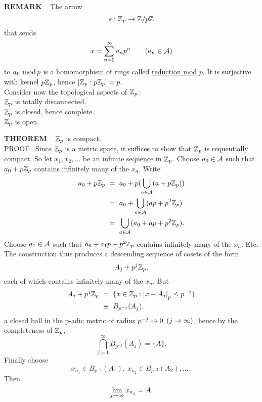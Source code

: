 \begin{x}{\small\bf REMARK} \ %
The arrow
\[
\epsilon: \mathbb{Z}_p \rightarrow \mathbb{Z} / p\mathbb{Z}
\]
that sends
\[
x = \sum_{n=0}^\infty a_np^n		\qquad \text{($a_n \in\mathcal{A}$)}
\]
to $a_0 \ \text{mod}\hspace{0.05cm} p$ is a homomorphism of rings called 
\underline{reduction mod $p$}.  
It is surjective with kernel $p\mathbb{Z}_p$, hence $[\mathbb{Z}_p:p\mathbb{Z}_p] = p$.\\

Consider now the topological aspects of $\mathbb{Z}_p$:\\
\indent\textbullet \quad $\mathbb{Z}_p$ is totally disconnected.\\
\indent\textbullet \quad $\mathbb{Z}_p$ is closed, hence complete.\\
\indent\textbullet \quad $\mathbb{Z}_p$ is open.\\

\]
\end{x}
\vspace{0.1cm}

\begin{x}{\small\bf THEOREM} \ %
$\mathbb{Z}_p$ is compact.\\

\indent PROOF \  
Since $\mathbb{Z}_p$ is a metric space, it suffices to show that $\mathbb{Z}_p$ is sequentially compact.  So let $x_1, x_2, \dots $ be an infinite sequence in $\mathbb{Z}_p$.  Choose $a_0 \in \mathcal{A}$ such that $a_0 + p\mathbb{Z}_p$ contains infinitely many of the $x_n$.  Write
\[
\begin{aligned}
a_0 + p\Z_p  \ 
&= \ a_0 + p( \bigcup\limits_{a \in \sA} (a + p\Z_p))\\
&= \ a_0 +  \bigcup\limits_{a \in \sA} (ap + p^2\Z_p)\\
&= \ \bigcup\limits_{a \in \sA} (a_0 + ap + p^2\Z_p).
\end{aligned}
\]
Choose $a_1 \in \mathcal{A}$ such that $a_0 + a_1p + p^2\mathbb{Z}_p$ contains infinitely many of the $x_n$.  Etc.  
The construction thus produces a descending sequence of cosets of the form
\[
A_j + p^j\mathbb{Z}_p,
\] 
each of which contains infinitely many of the $x_n$.  But
\[
\begin{aligned}
A_j + p^j\mathbb{Z}_p \  
&= \  \{x \in \mathbb{Z}_p: \left\vert x - A_j\right\vert_p \le p^{-j}\}\\
&\equiv \  B_{p^{-j}}(A_j),
\end{aligned}
\]
a closed ball in the p-adic metric of radius $p^{-j} \rightarrow 0$ $(j \rightarrow \infty)$, hence by the completeness of $\mathbb{Z}_p$,
\[
\bigcap\limits_{j=1}^\infty B_{p^{-j}}(A_j) = \{A\}.
\]
Finally choose
\[
x_{n_1} \in B_{p^{-1}}(A_1),  \ x_{n_2} \in B_{p^{-2}}(A_2), \dots \ .
\]
Then
\[
\lim_{j \rightarrow \infty} x_{n_j} = A.
\]
\end{x}
\vspace{0.1cm}

